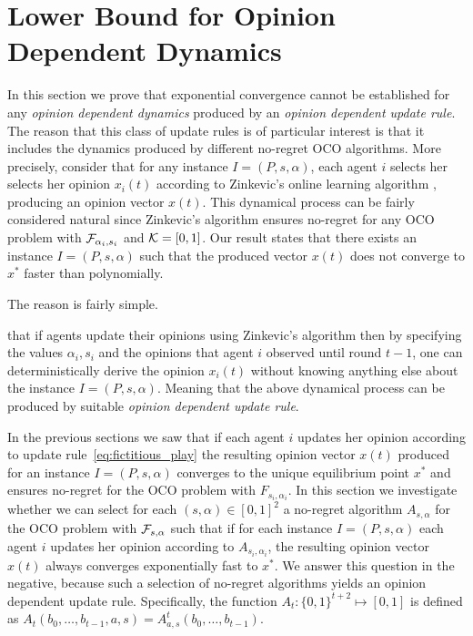 \section{Lower Bound for Opinion Dependent Dynamics}\label{s:lower_bound}
In this section we prove that exponential convergence
cannot be established for any \emph{opinion dependent dynamics}
produced by an \emph{opinion dependent update rule}. The reason
that this class of update rules is of particular interest is that
it includes the dynamics produced by different no-regret OCO algorithms.
More precisely, consider that for any instance $I=(P,s,\alpha)$, each
agent $i$ selects her selects her opinion $x_i(t)$ according
to Zinkevic's online learning algorithm \cite{Z03}, producing 
an opinion vector $x(t)$. This dynamical process can be fairly 
considered natural since Zinkevic's algorithm ensures no-regret 
for any OCO problem with $\mathcal{F}_{\alpha_i,s_i}$ and $\mathcal{K}=[0,1]$.
Our result states that there exists an instance $I=(P,s,\alpha)$
such that the produced vector $x(t)$ does not converge to $x^*$ faster than 
polynomially. 

The reason is fairly simple. 


that if agents update their opinions
using Zinkevic's algorithm then by specifying the values $\alpha_i,s_i$ 
and the opinions that agent $i$ observed until round $t-1$, 
one can deterministically derive the opinion $x_i(t)$ without knowing anything 
else about the instance $I=(P,s,\alpha)$. Meaning that the above dynamical
process can be produced by suitable \emph{opinion dependent update rule}. 



In the previous sections we saw that if each
agent $i$ updates her opinion according to
update rule~\ref{eq:fictitious_play}
the resulting opinion vector $x(t)$ produced
for an instance $I=(P,s,\alpha)$ converges
to the unique equilibrium point $x^*$ and
ensures no-regret for the OCO problem 
with $F_{s_i,\alpha_i}$. In this section we investigate whether we
can select
for each $(s,\alpha) \in [0,1]^2$ a no-regret algorithm
$A_{s,\alpha}$ for the OCO problem with 
$\mathcal{F}_{s,\alpha}$ such that if for each instance
$I=(P,s,\alpha)$ each agent $i$ updates her 
opinion according to $A_{s_i,\alpha_i}$,
the resulting opinion vector $x(t)$ always converges 
exponentially fast to $x^*$.
We answer this question in the negative, 
because such a selection of no-regret algorithms yields an
opinion dependent update rule. Specifically, the function
$A_t:\{0,1\}^{t+2} \mapsto [0,1]$ is defined
as $A_t(b_0,\ldots,b_{t-1},a,s) = A^t_{a,s}(b_0,\ldots,b_{t-1})$.

